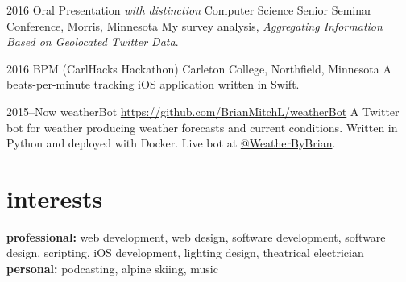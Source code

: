 \documentclass[]{cv-style} %
\begin{document}
\begin{entrylist}


\entry
{2016}
{Oral Presentation {\normalfont \emph{with distinction}}}
{Computer Science Senior Seminar Conference, Morris, Minnesota}
{My survey analysis, \emph{Aggregating Information Based on Geolocated Twitter Data}.}


\entry
{2016}
{BPM (CarlHacks Hackathon)}
{Carleton College, Northfield, Minnesota}
{A beats-per-minute tracking iOS application written in Swift.}


\entry
{2015--Now}
{weatherBot}
{\href{https://github.com/BrianMitchL/weatherBot}{https://github.com/BrianMitchL/weatherBot}}
{A Twitter bot for weather producing weather forecasts and current conditions. Written in Python and deployed with Docker. Live bot at \href{https://twitter.com/WeatherByBrian}{@WeatherByBrian}.}


\end{entrylist}


%
%
%
%
%


\section{interests}

\textbf{professional:} web development, web design, software development, software design, scripting, iOS development, lighting design, theatrical electrician \textbf{personal:} podcasting, alpine skiing, music
\end{document}
